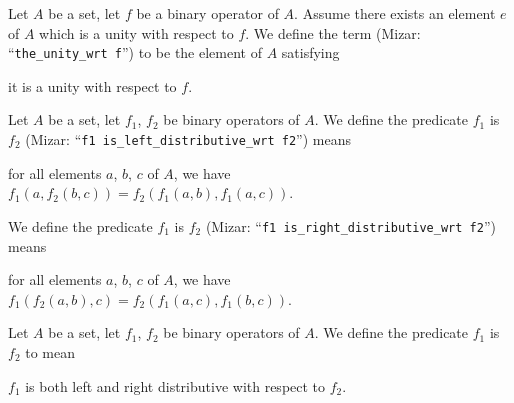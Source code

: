 \documentclass{article}
\begin{document}
\begin{definition}
Let $A$ be a set, let $f$ be a binary operator of $A$.
Assume there exists an element $e$ of $A$ which is a unity with respect
to $f$.
We define the term  (Mizar: ``\verb#the_unity_wrt f#'')
to be the element of $A$ satisfying
\begin{defn}
\item it is a unity with respect to $f$.
\end{defn}
\end{definition}

\begin{definition}
Let $A$ be a set, let $f_{1}$, $f_{2}$ be binary operators of $A$.
We define the predicate $f_{1}$ is  $f_{2}$
(Mizar: ``\verb#f1 is_left_distributive_wrt f2#'') means
\begin{defn}
\item for all elements $a$, $b$, $c$ of $A$, we have
  $f_{1}(a,f_{2}(b,c))=f_{2}(f_{1}(a,b), f_{1}(a,c))$.
\end{defn}
We define the predicate $f_{1}$ is  $f_{2}$
(Mizar: ``\verb#f1 is_right_distributive_wrt f2#'') means
\begin{defn}
\item for all elements $a$, $b$, $c$ of $A$, we have
  $f_{1}(f_{2}(a,b),c)=f_{2}(f_{1}(a,c), f_{1}(b,c))$.
\end{defn}
\end{definition}

\begin{definition}
Let $A$ be a set, let $f_{1}$, $f_{2}$ be binary operators of $A$.
We define the predicate $f_{1}$ is 
$f_{2}$ to mean
\begin{defn}
\item $f_{1}$ is both left and right distributive with respect to $f_{2}$.
\end{defn}
\end{definition}
\end{document}
